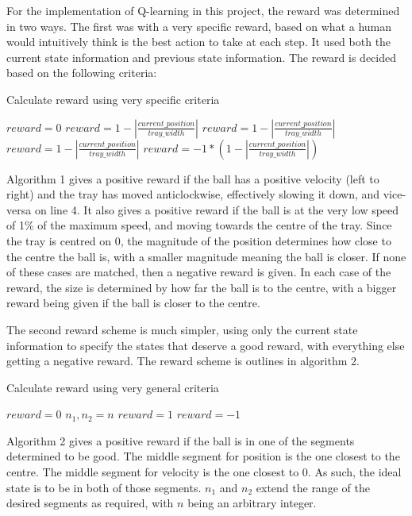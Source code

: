 \documentclass[12pt,a4paper]{article}
\begin{document}
For the implementation of Q-learning in this project, the reward was determined in two ways. The first was with a very specific reward, based on what a human would intuitively think is the best action to take at each step. It used both the current state information and previous state information. The reward is decided based on the following criteria:
\begin{algorithm}[H]
	\caption{Calculate reward using very specific criteria}
	\label{ql_specific}
	\begin{algorithmic}[1]
		\State $reward = 0$
			\State $reward = 1 - |\frac{current\_position}{tray\_width}|$
			\State $reward = 1 - |\frac{current\_position}{tray\_width}|$
			\State $reward = 1 - |\frac{current\_position}{tray\_width}|$
		\Else 
			\State $reward = -1 * (1 -|\frac{current\_position}{tray\_width}|)$
		\EndIf
	\end{algorithmic}
\end{algorithm}
Algorithm 1 gives a positive reward if the ball has a positive velocity (left to right) and the tray has moved anticlockwise, effectively slowing it down, and vice-versa on line 4. It also gives a positive reward if the ball is at the very low speed of 1\% of the maximum speed, and moving towards the centre of the tray. Since the tray is centred on 0, the magnitude of the position determines how close to the centre the ball is, with a smaller magnitude meaning the ball is closer. If none of these cases are matched, then a negative reward is given. In each case of the reward, the size is determined by how far the ball is to the centre, with a bigger reward being given if the ball is closer to the centre.

The second reward scheme is much simpler, using only the current state information to specify the states that deserve a good reward, with everything else getting a negative reward. The reward scheme is outlines in algorithm 2.

\begin{algorithm}[H]
	\caption{Calculate reward using very general criteria}
	\label{ql_general}
	\begin{algorithmic}[1]
		\State $reward = 0$
		\State $n_1, n_2 = n$
			\State $reward = 1$
		\Else 
			\State $reward = -1$
		\EndIf
	\end{algorithmic}
\end{algorithm}
Algorithm 2 gives a positive reward if the ball is in one of the segments determined to be good. The middle segment for position is the one closest to the centre. The middle segment for velocity is the one closest to 0. As such, the ideal state is to be in both of those segments. $n_1$ and $n_2$ extend the range of the desired segments as required, with $n$ being an arbitrary integer.
\end{document}
